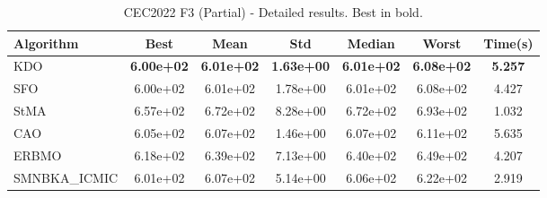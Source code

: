 \begin{table}[H]
\centering\small
\caption{CEC2022 F3 (Partial) - Detailed results. Best in bold.}
\label{tab:cec2022_F3}
\begin{tabular}{lcccccc}
\toprule
\textbf{Algorithm} & \textbf{Best} & \textbf{Mean} & \textbf{Std} & \textbf{Median} & \textbf{Worst} & \textbf{Time(s)} \\
\midrule
KDO & \textbf{6.00e+02} & \textbf{6.01e+02} & \textbf{1.63e+00} & \textbf{6.01e+02} & \textbf{6.08e+02} & \textbf{5.257} \\
SFO & 6.00e+02 & 6.01e+02 & 1.78e+00 & 6.01e+02 & 6.08e+02 & 4.427 \\
StMA & 6.57e+02 & 6.72e+02 & 8.28e+00 & 6.72e+02 & 6.93e+02 & 1.032 \\
CAO & 6.05e+02 & 6.07e+02 & 1.46e+00 & 6.07e+02 & 6.11e+02 & 5.635 \\
ERBMO & 6.18e+02 & 6.39e+02 & 7.13e+00 & 6.40e+02 & 6.49e+02 & 4.207 \\
SMNBKA_ICMIC & 6.01e+02 & 6.07e+02 & 5.14e+00 & 6.06e+02 & 6.22e+02 & 2.919 \\
\bottomrule
\end{tabular}
\end{table}
